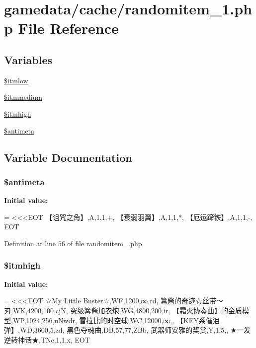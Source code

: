 \hypertarget{randomitem__1_8php}{\section{gamedata/cache/randomitem\+\_\+1.php File Reference}
\label{randomitem__1_8php}
}
\subsection*{Variables}
\begin{DoxyCompactItemize}
\item 
\hyperlink{randomitem__1_8php_ae9da24b832a28bf9820e7362042062d2}{\$itmlow}
\item 
\hyperlink{randomitem__1_8php_a58ffa9cdc49afbc651d4d869a464f5f5}{\$itmmedium}
\item 
\hyperlink{randomitem__1_8php_abda69753838545154c6459c9af1cc93b}{\$itmhigh}
\item 
\hyperlink{randomitem__1_8php_a818d6205748cf9a0d9112c1371afe5f1}{\$antimeta}
\end{DoxyCompactItemize}


\subsection{Variable Documentation}
\hypertarget{randomitem__1_8php_a818d6205748cf9a0d9112c1371afe5f1}{
\subsubsection[{\$antimeta}]{\setlength{\rightskip}{0pt plus 5cm}\$antimeta}}\label{randomitem__1_8php_a818d6205748cf9a0d9112c1371afe5f1}
{\bfseries Initial value\+:}
\begin{DoxyCode}
= <<<EOT
【诅咒之角】,A,1,1,+,
【衰弱羽翼】,A,1,1,*,
【厄运蹄铁】,A,1,1,-,
EOT
\end{DoxyCode}


Definition at line 56 of file randomitem\+\_.\+php.

\hypertarget{randomitem__1_8php_abda69753838545154c6459c9af1cc93b}{
\subsubsection[{\$itmhigh}]{\setlength{\rightskip}{0pt plus 5cm}\$itmhigh}}\label{randomitem__1_8php_abda69753838545154c6459c9af1cc93b}
{\bfseries Initial value\+:}
\begin{DoxyCode}
= <<<EOT
☆My Little Buster☆,WF,1200,∞,rd,
篝酱的奇迹☆丝带～刃,WK,4200,100,cjN,
究级篝酱加农炮,WG,4800,200,ir,
【霜火协奏曲】的金质模型,WP,1024,256,uNwdr,
雪拉比的时空球,WC,12000,∞,,
【KEY系催泪弹】,WD,3600,5,zd,
黑色夺魂曲,DB,57,77,ZBb,
武器师安雅的奖赏,Y,1,5,,
★一发逆转神话★,TNc,1,1,x,
EOT
\end{DoxyCode}


